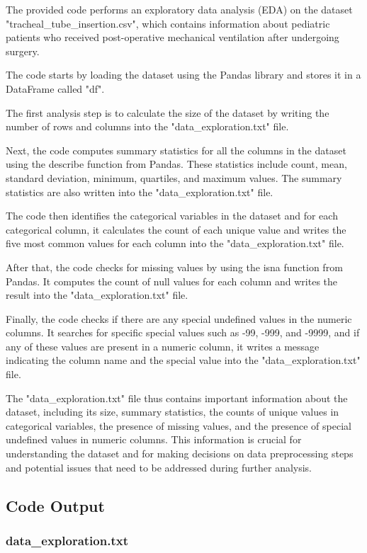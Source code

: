 \documentclass[11pt]{article}
\begin{document}
The provided code performs an exploratory data analysis (EDA) on the dataset "tracheal\_tube\_insertion.csv", which contains information about pediatric patients who received post-operative mechanical ventilation after undergoing surgery.

The code starts by loading the dataset using the Pandas library and stores it in a DataFrame called "df". 

The first analysis step is to calculate the size of the dataset by writing the number of rows and columns into the "data\_exploration.txt" file.

Next, the code computes summary statistics for all the columns in the dataset using the describe function from Pandas. These statistics include count, mean, standard deviation, minimum, quartiles, and maximum values. The summary statistics are also written into the "data\_exploration.txt" file.

The code then identifies the categorical variables in the dataset and for each categorical column, it calculates the count of each unique value and writes the five most common values for each column into the "data\_exploration.txt" file.

After that, the code checks for missing values by using the isna function from Pandas. It computes the count of null values for each column and writes the result into the "data\_exploration.txt" file.

Finally, the code checks if there are any special undefined values in the numeric columns. It searches for specific special values such as -99, -999, and -9999, and if any of these values are present in a numeric column, it writes a message indicating the column name and the special value into the "data\_exploration.txt" file.

The "data\_exploration.txt" file thus contains important information about the dataset, including its size, summary statistics, the counts of unique values in categorical variables, the presence of missing values, and the presence of special undefined values in numeric columns. This information is crucial for understanding the dataset and for making decisions on data preprocessing steps and potential issues that need to be addressed during further analysis.

\subsection{Code Output}

\subsubsection*{data\_exploration.txt}
\end{document}
